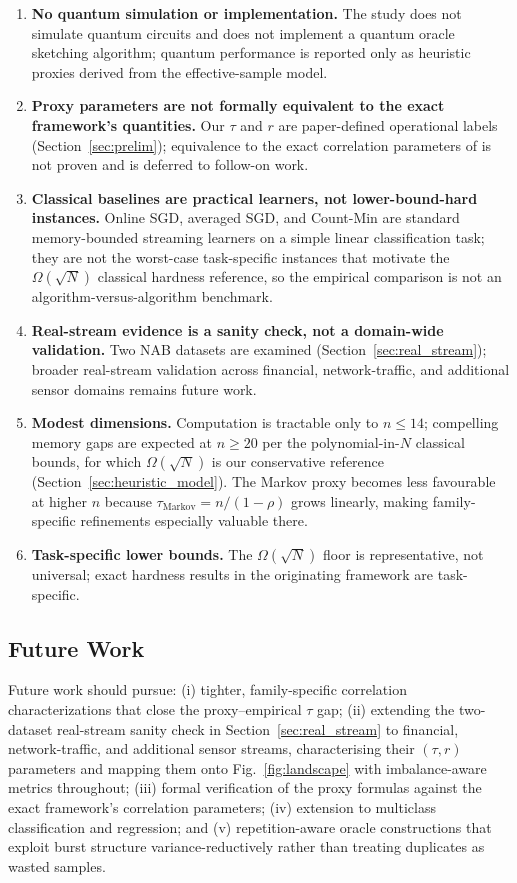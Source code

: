 \documentclass[preprint,12pt,authoryear]{elsarticle}
\begin{document}
\begin{enumerate}
    \item \textbf{No quantum simulation or implementation.} The study does not simulate quantum circuits and does not implement a quantum oracle sketching algorithm; quantum performance is reported only as heuristic proxies derived from the effective-sample model.
    \item \textbf{Proxy parameters are not formally equivalent to the exact framework's quantities.} Our $\tau$ and $r$ are paper-defined operational labels (Section~\ref{sec:prelim}); equivalence to the exact correlation parameters of \citet{zhao2026exponential} is not proven and is deferred to follow-on work.
    \item \textbf{Classical baselines are practical learners, not lower-bound-hard instances.} Online SGD, averaged SGD, and Count-Min are standard memory-bounded streaming learners on a simple linear classification task; they are not the worst-case task-specific instances that motivate the $\Omega(\sqrt{N})$ classical hardness reference, so the empirical comparison is not an algorithm-versus-algorithm benchmark.
    \item \textbf{Real-stream evidence is a sanity check, not a domain-wide validation.} Two NAB datasets are examined (Section~\ref{sec:real_stream}); broader real-stream validation across financial, network-traffic, and additional sensor domains remains future work.
    \item \textbf{Modest dimensions.} Computation is tractable only to $n \leq 14$; compelling memory gaps are expected at $n \geq 20$ per the polynomial-in-$N$ classical bounds, for which $\Omega(\sqrt{N})$ is our conservative reference (Section~\ref{sec:heuristic_model}). The Markov proxy becomes less favourable at higher $n$ because $\tau_{\text{Markov}} = n/(1-\rho)$ grows linearly, making family-specific refinements especially valuable there.
    \item \textbf{Task-specific lower bounds.} The $\Omega(\sqrt{N})$ floor is representative, not universal; exact hardness results in the originating framework are task-specific.
\end{enumerate}

\subsection{Future Work}
\label{sec:future_work}

Future work should pursue: (i) tighter, family-specific correlation characterizations that close the proxy--empirical $\tau$ gap; (ii) extending the two-dataset real-stream sanity check in Section~\ref{sec:real_stream} to financial, network-traffic, and additional sensor streams, characterising their $(\tau, r)$ parameters and mapping them onto Fig.~\ref{fig:landscape} with imbalance-aware metrics throughout; (iii) formal verification of the proxy formulas against the exact framework's correlation parameters; (iv) extension to multiclass classification and regression; and (v) repetition-aware oracle constructions that exploit burst structure variance-reductively rather than treating duplicates as wasted samples.
\end{document}
